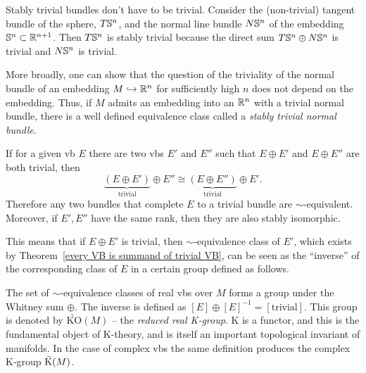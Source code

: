 \begin{example}
    Stably trivial bundles don't have to be trivial. Consider the (non-trivial) tangent bundle of the sphere, $T\mathbb{S}^n$, and  the normal line bundle $N\mathbb{S}^n$ of the embedding $\mathbb{S}^n\subset \mathbb{R}^{n+1}$. Then $T\mathbb{S}^n$ is stably trivial because the direct sum $T\mathbb{S}^n\oplus N\mathbb{S}^n$ is trivial and $N\mathbb{S}^n$ is trivial.

    More broadly, one can show that the question of the triviality of the normal bundle of an embedding $M\hookrightarrow \mathbb{R}^n$ for sufficiently high $n$ does not depend on the embedding. Thus, if $M$ admits an embedding into an $\mathbb{R}^n$ with a trivial normal bundle, there is a well defined equivalence class called a \emph{stably trivial normal bundle}.
\end{example}


\begin{cor}
If for a given \gls{vb} $E$ there are two \glspl{vb} $E'$ and $E''$ such that $E\oplus E'$ and $E\oplus E''$ are both trivial, then 
\[
\underbrace{(E\oplus E')}_{\text{trivial}}\oplus E''\cong \underbrace{(E\oplus E'')}_{\text{trivial}}\oplus E'.\]
Therefore any two bundles that complete $E$ to a trivial bundle are $\sim$-equivalent. Moreover, if $E',E''$ have the same rank, then they are also stably isomorphic.
\end{cor}

This means that if $E\oplus E'$ is trivial, then $\sim$-equivalence class of $E'$, which exists by Theorem~\ref{every VB is summand of trivial VB}, can be seen as the ``inverse'' of the corresponding class of $E$ in a certain group defined as follows.

\begin{defn}
The set of $\sim$-equivalence classes of real \glspl{vb} over $M$ forms a group under the Whitney sum $\oplus$.
The inverse is defined as $[E]\oplus [E]^{-1}=[\text{trivial}]$. This group is denoted by $\widetilde{\mathrm{KO}}(M)$ -- the \emph{reduced real K-group}. K is a functor, and this is the fundamental object of K-theory, and is itself an important topological invariant of manifolds. In the case of complex \glspl{vb} the same definition produces the complex K-group $\wt{\mathrm{K}}(M)$.
\end{defn}

